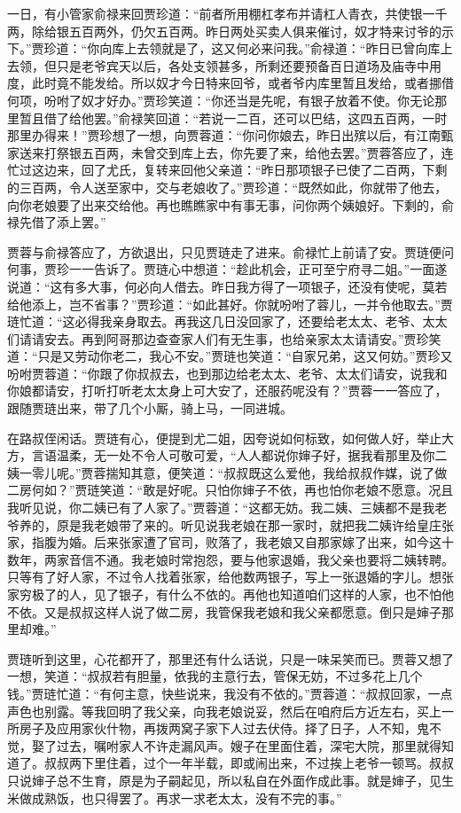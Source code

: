 一日，有小管家俞禄来回贾珍道：“前者所用棚杠孝布并请杠人青衣，共使银一千两，除给银五百两外，仍欠五百两。昨日两处买卖人俱来催讨，奴才特来讨爷的示下。”贾珍道：“你向库上去领就是了，这又何必来问我。”俞禄道：“昨日已曾向库上去领，但只是老爷宾天以后，各处支领甚多，所剩还要预备百日道场及庙寺中用度，此时竟不能发给。所以奴才今日特来回爷，或者爷内库里暂且发给，或者挪借何项，吩咐了奴才好办。”贾珍笑道：“你还当是先呢，有银子放着不使。你无论那里暂且借了给他罢。”俞禄笑回道：“若说一二百，还可以巴结，这四五百两，一时那里办得来！”贾珍想了一想，向贾蓉道：“你问你娘去，昨日出殡以后，有江南甄家送来打祭银五百两，未曾交到库上去，你先要了来，给他去罢。”贾蓉答应了，连忙过这边来，回了尤氏，复转来回他父亲道：“昨日那项银子已使了二百两，下剩的三百两，令人送至家中，交与老娘收了。”贾珍道：“既然如此，你就带了他去，向你老娘要了出来交给他。再也瞧瞧家中有事无事，问你两个姨娘好。下剩的，俞禄先借了添上罢。”

贾蓉与俞禄答应了，方欲退出，只见贾琏走了进来。俞禄忙上前请了安。贾琏便问何事，贾珍一一告诉了。贾琏心中想道：“趁此机会，正可至宁府寻二姐。”一面遂说道：“这有多大事，何必向人借去。昨日我方得了一项银子，还没有使呢，莫若给他添上，岂不省事？”贾珍道：“如此甚好。你就吩咐了蓉儿，一并令他取去。”贾琏忙道：“这必得我亲身取去。再我这几日没回家了，还要给老太太、老爷、太太们请请安去。再到阿哥那边查查家人们有无生事，也给亲家太太请请安。”贾珍笑道：“只是又劳动你老二，我心不安。”贾琏也笑道：“自家兄弟，这又何妨。”贾珍又吩咐贾蓉道：“你跟了你叔叔去，也到那边给老太太、老爷、太太们请安，说我和你娘都请安，打听打听老太太身上可大安了，还服药呢没有？”贾蓉一一答应了，跟随贾琏出来，带了几个小厮，骑上马，一同进城。

在路叔侄闲话。贾琏有心，便提到尤二姐，因夸说如何标致，如何做人好，举止大方，言语温柔，无一处不令人可敬可爱，“人人都说你婶子好，据我看那里及你二姨一零儿呢。”贾蓉揣知其意，便笑道：“叔叔既这么爱他，我给叔叔作媒，说了做二房何如？”贾琏笑道：“敢是好呢。只怕你婶子不依，再也怕你老娘不愿意。况且我听见说，你二姨已有了人家了。”贾蓉道：“这都无妨。我二姨、三姨都不是我老爷养的，原是我老娘带了来的。听见说我老娘在那一家时，就把我二姨许给皇庄张家，指腹为婚。后来张家遭了官司，败落了，我老娘又自那家嫁了出来，如今这十数年，两家音信不通。我老娘时常抱怨，要与他家退婚，我父亲也要将二姨转聘。只等有了好人家，不过令人找着张家，给他数两银子，写上一张退婚的字儿。想张家穷极了的人，见了银子，有什么不依的。再他也知道咱们这样的人家，也不怕他不依。又是叔叔这样人说了做二房，我管保我老娘和我父亲都愿意。倒只是婶子那里却难。”

贾琏听到这里，心花都开了，那里还有什么话说，只是一味呆笑而已。贾蓉又想了一想，笑道：“叔叔若有胆量，依我的主意行去，管保无妨，不过多花上几个钱。”贾琏忙道：“有何主意，快些说来，我没有不依的。”贾蓉道：“叔叔回家，一点声色也别露。等我回明了我父亲，向我老娘说妥，然后在咱府后方近左右，买上一所房子及应用家伙什物，再拨两窝子家下人过去伏侍。择了日子，人不知，鬼不觉，娶了过去，嘱咐家人不许走漏风声。嫂子在里面住着，深宅大院，那里就得知道了。叔叔两下里住着，过个一年半载，即或闹出来，不过挨上老爷一顿骂。叔叔只说婶子总不生育，原是为子嗣起见，所以私自在外面作成此事。就是婶子，见生米做成熟饭，也只得罢了。再求一求老太太，没有不完的事。”

